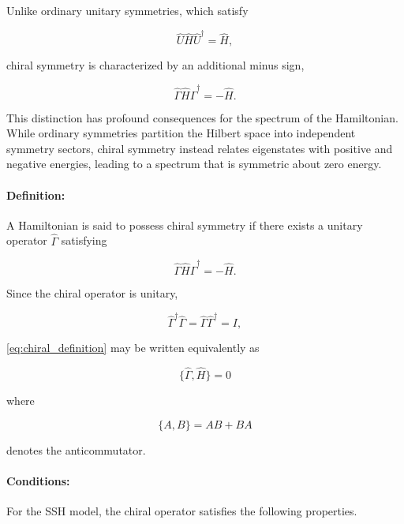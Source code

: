 \documentclass[11pt, a4paper]{article}
\begin{document}
Unlike ordinary unitary symmetries, which satisfy

\[
\hat{U}\hat{H}\hat{U}^{\dagger}=\hat{H},
\]

chiral symmetry is characterized by an additional minus sign,

\[
\hat{\Gamma}\hat{H}\hat{\Gamma}^{\dagger}=-\hat{H}.
\]

This distinction has profound consequences for the spectrum of the Hamiltonian. While ordinary symmetries partition the Hilbert space into independent symmetry sectors, chiral symmetry instead relates eigenstates with positive and negative energies, leading to a spectrum that is symmetric about zero energy.
\vspace{1em}

\paragraph{Definition:}

A Hamiltonian is said to possess chiral symmetry if there exists a unitary operator
$\hat{\Gamma}$ satisfying

\begin{equation}
\hat{\Gamma}\hat{H}\hat{\Gamma}^{\dagger}
=
-\hat{H}.
\label{eq:chiral_definition}
\end{equation}

Since the chiral operator is unitary,

\begin{equation*}
\hat{\Gamma}^{\dagger}\hat{\Gamma}
=
\hat{\Gamma}\hat{\Gamma}^{\dagger}
=
I,
\end{equation*}

\cref{eq:chiral_definition} may be written equivalently as

\begin{equation*}
    \{ \hat{\Gamma},\hat{H}\} = 0
\end{equation*}

where

\[
\{A,B\}=AB+BA
\]

denotes the anticommutator.


\paragraph{Conditions:}

For the SSH model, the chiral operator satisfies the following properties.
\end{document}
